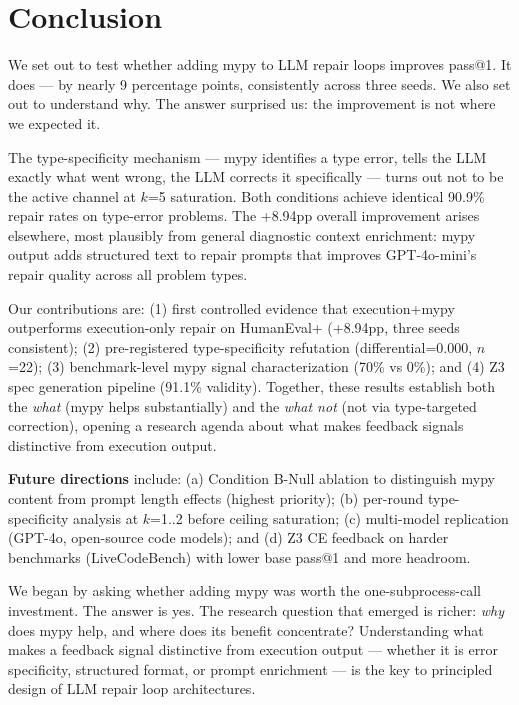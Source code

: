 \section{Conclusion}

We set out to test whether adding mypy to LLM repair loops improves pass@1.
It does --- by nearly 9 percentage points, consistently across three seeds. We
also set out to understand why. The answer surprised us: the improvement is
not where we expected it.

The type-specificity mechanism --- mypy identifies a type error, tells the LLM
exactly what went wrong, the LLM corrects it specifically --- turns out not to
be the active channel at $k$=5 saturation. Both conditions achieve identical
90.9\% repair rates on type-error problems. The +8.94pp overall improvement
arises elsewhere, most plausibly from general diagnostic context enrichment:
mypy output adds structured text to repair prompts that improves GPT-4o-mini's
repair quality across all problem types.

Our contributions are: (1) first controlled evidence that execution+mypy
outperforms execution-only repair on HumanEval+ (+8.94pp, three seeds
consistent); (2) pre-registered type-specificity refutation
(differential=0.000, $n$=22); (3) benchmark-level mypy signal characterization
(70\% vs 0\%); and (4) Z3 spec generation pipeline (91.1\% validity). Together,
these results establish both the \emph{what} (mypy helps substantially) and the
\emph{what not} (not via type-targeted correction), opening a research agenda
about what makes feedback signals distinctive from execution output.

\textbf{Future directions} include: (a) Condition B-Null ablation to distinguish
mypy content from prompt length effects (highest priority); (b) per-round
type-specificity analysis at $k$=1..2 before ceiling saturation; (c)
multi-model replication (GPT-4o, open-source code models); and (d) Z3 CE
feedback on harder benchmarks (LiveCodeBench) with lower base pass@1 and more
headroom.

We began by asking whether adding mypy was worth the one-subprocess-call
investment. The answer is yes. The research question that emerged is richer:
\emph{why} does mypy help, and where does its benefit concentrate?
Understanding what makes a feedback signal distinctive from execution output ---
whether it is error specificity, structured format, or prompt enrichment --- is
the key to principled design of LLM repair loop architectures.
